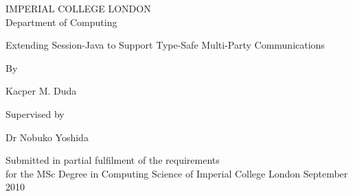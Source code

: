 \begin{titlepage}
\begin{center}
\vspace{4in}
{\begin{large}IMPERIAL COLLEGE LONDON \\ Department of Computing\end{large}}
\vskip 3in
{\begin{huge}Extending Session-Java to Support Type-Safe Multi-Party Communications\end{huge}}
\vskip 1in
{By\\\begin{large} Kacper M. Duda\end{large}}
\vskip 1in
{Supervised by \\\begin{large}Dr Nobuko Yoshida\end{large}}
\vskip 1in
{Submitted in partial fulfilment of the requirements\\for the MSc Degree in Computing Science of Imperial College London}
\vfill
September 2010
\end{center}
\end{titlepage}